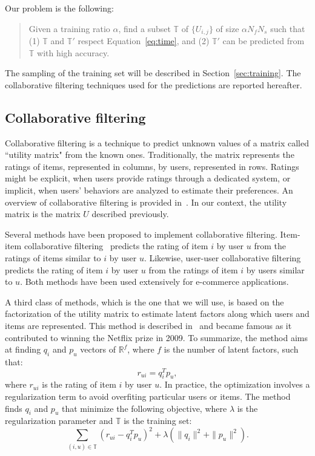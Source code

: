 \documentclass[10pt, conference, compsocconf]{IEEEtran}
\begin{document}
Our problem is the following:
\begin{quote}
Given a training ratio $\alpha$, find a subset $\mathbb{T}$ of 
$\{U_{i,j}\}$ of size $\alpha N_f N_s$ such that (1) $\mathbb{T}$ and 
$\mathbb{T'}$ respect Equation~\ref{eq:time}, and (2) $\mathbb{T'}$ can 
be predicted from $\mathbb{T}$ with high accuracy.
\end{quote}
The sampling of the training set will be described in Section~\ref{sec:training}.
The collaborative filtering techniques used for the predictions are reported hereafter.

\subsection{Collaborative filtering}

Collaborative filtering is a technique to predict unknown values of a 
matrix called ``utility matrix" from the known ones. Traditionally, the 
matrix represents the ratings of items, represented in columns, by 
users, represented in rows. Ratings might be explicit, when users 
provide ratings through a dedicated system, or implicit, when users' 
behaviors are analyzed to estimate their preferences. An 
overview of collaborative filtering is provided 
in~\cite{leskovec2014mining}. In our context, the utility matrix is the
matrix $U$ described previously.

Several methods have been proposed to implement collaborative 
filtering. Item-item collaborative filtering~\cite{breese1998empirical, linden2003amazon} predicts 
the rating of item $i$ by user $u$ from the ratings of items similar to 
$i$ by user $u$. Likewise, user-user collaborative 
filtering~\cite{breese1998empirical} predicts the rating of item $i$ by user $u$ 
from the ratings of item $i$ by users similar to $u$. Both methods
have been used extensively for e-commerce applications.

A third class of methods, which is the one that we will use, is based 
on the factorization of the utility matrix to estimate latent factors 
along which users and items are represented. This method is described 
in~\cite{koren2009matrix} and became famous as it contributed to 
winning the 
Netflix prize in 2009. To summarize, the method aims at finding $q_i$ 
and $p_u$ vectors of $\mathbb{R}^f$, where $f$ is the number of latent factors, such that:
\begin{equation*}
r_{ui} = q_i^Tp_u,
\end{equation*}
where $r_{ui}$ is the rating of item $i$ by user $u$. In practice, the optimization
involves a regularization term to avoid overfiting particular users or items. The method
finds $q_i$ and $p_u$ that minimize the following objective, where $\lambda$ is the regularization parameter and $\mathbb{T}$ is the training set:
\begin{equation*}
\sum_{(i,u) \in \mathbb{T}}\left( r_{ui} - q_i^Tp_u\right)^2+\lambda \left( \|{q_i}\|^2 + \|{p_u}\|^2\right).
\end{equation*}
\end{document}
